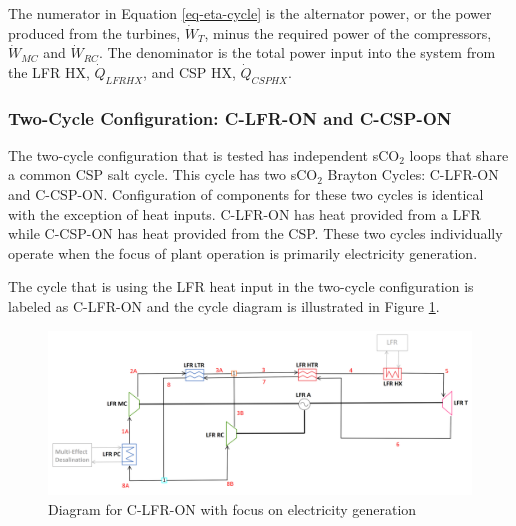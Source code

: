 \begin{paracol}{2}
The numerator in Equation \ref{eq-eta-cycle} is the alternator power, or the power produced from the turbines, $\dot{W}_{T}$, minus the required power of the compressors, $\dot{W}_{MC}$ and $\dot{W}_{RC}$. The denominator is the total power input into the system from the LFR HX, $\dot{Q}_{LFRHX}$, and CSP HX, $\dot{Q}_{CSPHX}$.


\subsubsection{Two-Cycle Configuration: C-LFR-ON and C-CSP-ON} %

The two-cycle configuration that is tested has independent sCO$_{2}$ loops that share a common CSP salt cycle. This cycle has two sCO$_{2}$ Brayton Cycles: C-LFR-ON and C-CSP-ON. Configuration of components for these two cycles is identical with the exception of heat inputs. C-LFR-ON has heat provided from a LFR while C-CSP-ON has heat provided from the CSP. These two cycles individually operate when the focus of plant operation is primarily electricity generation. 
    
The cycle that is using the LFR heat input in the two-cycle configuration is labeled as C-LFR-ON and the cycle diagram is illustrated in Figure \ref{c-lfr-on}. 

\end{paracol}
\begin{figure}[H] 
    \widefigure
    \includegraphics[width=\linewidth]{Definitions/c-lfr-on.pdf}
    \caption{Diagram for C-LFR-ON with focus on electricity generation\label{c-lfr-on}}
\end{figure}

